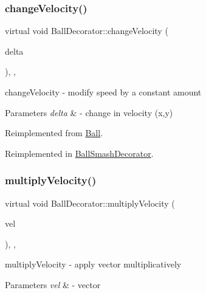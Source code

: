 \subsubsection{\texorpdfstring{change\+Velocity()}{changeVelocity()}}
{\footnotesize\ttfamily virtual void Ball\+Decorator\+::change\+Velocity (\begin{DoxyParamCaption}\item[{const Q\+Vector2D \&}]{delta }\end{DoxyParamCaption})\hspace{0.3cm}{\ttfamily [inline]}, {\ttfamily [override]}, {\ttfamily [virtual]}}



change\+Velocity -\/ modify speed by a constant amount 


\begin{DoxyParams}{Parameters}
{\em delta} & -\/ change in velocity (x,y) \\
\hline
\end{DoxyParams}


Reimplemented from \mbox{\hyperlink{class_ball_add51f90f60cb862daa8f3f7aa743f933}{Ball}}.



Reimplemented in \mbox{\hyperlink{class_ball_smash_decorator_ad59848156e8eabad3e561a1d113f7029}{Ball\+Smash\+Decorator}}.

\mbox{\label{class_ball_decorator_ad1a9139a5c41d17d0eebf007afb984e7}} 
\subsubsection{\texorpdfstring{multiply\+Velocity()}{multiplyVelocity()}}
{\footnotesize\ttfamily virtual void Ball\+Decorator\+::multiply\+Velocity (\begin{DoxyParamCaption}\item[{const Q\+Vector2D \&}]{vel }\end{DoxyParamCaption})\hspace{0.3cm}{\ttfamily [inline]}, {\ttfamily [override]}, {\ttfamily [virtual]}}



multiply\+Velocity -\/ apply vector multiplicatively 


\begin{DoxyParams}{Parameters}
{\em vel} & -\/ vector \\
\hline
\end{DoxyParams}


